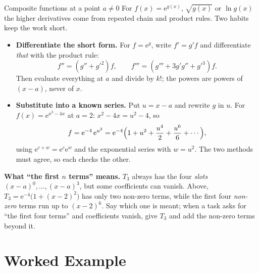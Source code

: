 \begin{rulebox}{Composite functions at a point $a\neq0$}
For $f(x)=\mathrm{e}^{g(x)}$, $\sqrt{g(x)}$ or $\ln g(x)$ the higher
derivatives come from repeated chain and product rules. Two habits keep the
work short.
\begin{itemize}[leftmargin=1.6em,itemsep=0.3ex]
  \item \textbf{Differentiate the short form.} For $f=\mathrm{e}^{g}$,
        write $f'=g'f$ and differentiate \emph{that} with the product rule:
        \[
          f''=(g''+g'^{2})f,\qquad
          f'''=(g'''+3g'g''+g'^{3})f .
        \]
        Then evaluate everything at $a$ and divide by $k!$; the powers are
        powers of $(x-a)$, never of $x$.
  \item \textbf{Substitute into a known series.} Put $u=x-a$ and rewrite
        $g$ in $u$. For $f(x)=\mathrm{e}^{x^{2}-4x}$ at $a=2$:
        $x^{2}-4x=u^{2}-4$, so
        \[
          f=\mathrm{e}^{-4}\,\mathrm{e}^{u^{2}}
           =\mathrm{e}^{-4}\Bigl(1+u^{2}+\frac{u^{4}}{2}+\frac{u^{6}}{6}
            +\cdots\Bigr),
        \]
        using $\mathrm{e}^{c+w}=\mathrm{e}^{c}\mathrm{e}^{w}$ and the
        exponential series with $w=u^{2}$. The two methods must agree, so
        each checks the other.
\end{itemize}
\textbf{What ``the first $n$ terms'' means.} $T_{3}$ always has the four
\emph{slots} $(x-a)^{0},\ldots,(x-a)^{3}$, but some coefficients can vanish.
Above, $T_{3}=\mathrm{e}^{-4}\bigl(1+(x-2)^{2}\bigr)$ has only two non-zero
terms, while the first four \emph{non-zero} terms run up to $(x-2)^{6}$.
Say which one is meant; when a task asks for ``the first four terms'' and
coefficients vanish, give $T_{3}$ and add the non-zero terms beyond it.
\end{rulebox}

\section{Worked Example}

